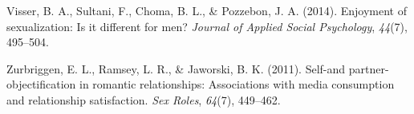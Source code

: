 \documentclass[
  english,
  man]{apa6}
\newlength{\cslhangindent}
\newlength{\cslentryspacingunit} %
\newenvironment{CSLReferences}[2] %
 {%
  \setlength{\parindent}{0pt}
  \ifodd #1
  \let\oldpar\par
  \def\par{\hangindent=\cslhangindent\oldpar}
  \fi
  \setlength{\parskip}{#2\cslentryspacingunit}
 }%
 {}
\begin{document}
\begin{CSLReferences}{1}{0}
\leavevmode{}%
Visser, B. A., Sultani, F., Choma, B. L., \& Pozzebon, J. A. (2014). Enjoyment of sexualization: Is it different for men? \emph{Journal of Applied Social Psychology}, \emph{44}(7), 495--504.

\leavevmode{}%
Zurbriggen, E. L., Ramsey, L. R., \& Jaworski, B. K. (2011). Self-and partner-objectification in romantic relationships: Associations with media consumption and relationship satisfaction. \emph{Sex Roles}, \emph{64}(7), 449--462.

\end{CSLReferences}

\endgroup
\end{document}
